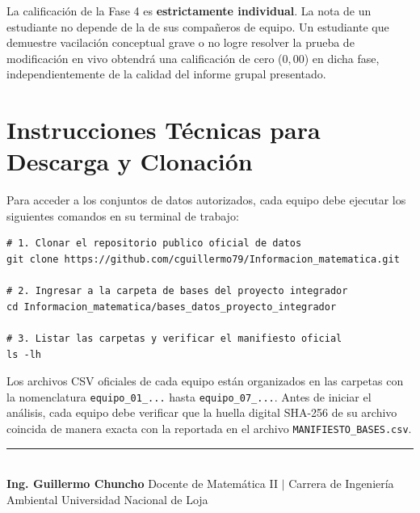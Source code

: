 \documentclass[11pt,a4paper]{article}
\begin{document}
\begin{alertbox}[title=Principio de Evaluación Individual en la Fase 4]
La calificación de la Fase 4 es \textbf{estrictamente individual}. La nota de un estudiante no depende de la de sus compañeros de equipo. Un estudiante que demuestre vacilación conceptual grave o no logre resolver la prueba de modificación en vivo obtendrá una calificación de cero ($0{,}00$) en dicha fase, independientemente de la calidad del informe grupal presentado.
\end{alertbox}

\vspace{0.15cm}

\section{Instrucciones Técnicas para Descarga y Clonación}

Para acceder a los conjuntos de datos autorizados, cada equipo debe ejecutar los siguientes comandos en su terminal de trabajo:

\begin{examplebox}[title=Comandos de Clonación del Repositorio de Datos]
\begin{verbatim}
# 1. Clonar el repositorio publico oficial de datos
git clone https://github.com/cguillermo79/Informacion_matematica.git

# 2. Ingresar a la carpeta de bases del proyecto integrador
cd Informacion_matematica/bases_datos_proyecto_integrador

# 3. Listar las carpetas y verificar el manifiesto oficial
ls -lh
\end{verbatim}
\end{examplebox}

\noindent Los archivos CSV oficiales de cada equipo están organizados en las carpetas con la nomenclatura \texttt{equipo\_01\_...} hasta \texttt{equipo\_07\_...}. Antes de iniciar el análisis, cada equipo debe verificar que la huella digital SHA-256 de su archivo coincida de manera exacta con la reportada en el archivo \texttt{MANIFIESTO\_BASES.csv}.

\vspace{0.35cm}
\begin{center}
  \rule{0.6\textwidth}{0.6pt}\\[0.15cm]
  {\footnotesize\textbf{Ing. Guillermo Chuncho}\newline
  Docente de Matemática II $\vert$ Carrera de Ingeniería Ambiental\newline
  Universidad Nacional de Loja}
\end{center}
\end{document}
